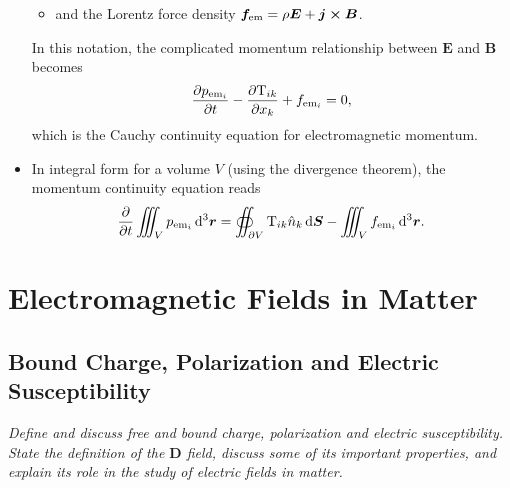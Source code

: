 \documentclass[11pt, a4paper]{article}
\newcommand{\diff}{\mathop{}\!\mathrm{d}} %
\newcommand{\dr}{\diff^{3} \r}  %
\renewcommand{\vec}[1]{\bm{#1}} %
\renewcommand{\r}{\vec{r}}
\newcommand{\E}{\vec{E}} %
\newcommand{\D}{\vec{D}}  %
\newcommand{\B}{\vec{B}} %
\newcommand{\TT}{\mathrm{T}}  %
\renewcommand{\j}{\vec{j}}  %
\begin{document}
\begin{itemize}
\begin{itemize}
        \item and the Lorentz force density $ \vec{f}_{\text{em}} = \rho \E + \j \cross \B $.
    \end{itemize}
	In this notation, the complicated momentum relationship between $ \E $ and $ \B $ becomes
	\begin{equation*}
		\pdv{p_{\text{em}_{i}}}{t} - \pdv{\TT_{ik}}{x_{k}} + f_{\text{em}_{i}} = 0,
	\end{equation*}
	which is the Cauchy continuity equation for electromagnetic momentum.
	
	\item In integral form for a volume $ V $ (using the divergence theorem), the momentum continuity equation reads
	\begin{equation*}
		\pdv{t}\iiint_{V}p_{\text{em}_{i}}\dr = \oiint_{\partial V}\TT_{ik}\hat{n}_{k} \diff \vec{S} - \iiint_{V} f_{\text{em}_{i}}\dr.
	\end{equation*}
	
	
\end{itemize}


\newpage
\section{Electromagnetic Fields in Matter}

\subsection{Bound Charge, Polarization and Electric Susceptibility}
\textit{Define and discuss free and bound charge, polarization and electric susceptibility. State the definition of the $ \D $ field, discuss some of its important properties, and explain its role in the study of electric fields in matter.}
\end{document}
